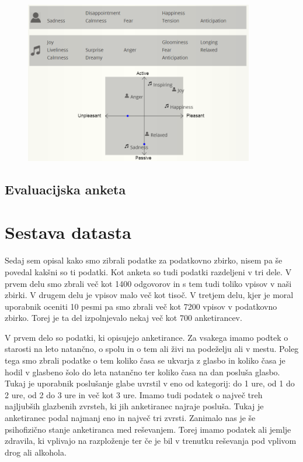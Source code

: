 \documentclass[a4paper, 12pt]{book}
\begin{document}
{\begin{figure}[hbt]
\centering
\includegraphics[width=10cm]{images/moodgraphdvo.png}

\caption{}
\label{moodgraphdvo}
\end{figure}

\subsection{Evaluacijska anketa}

\section{Sestava datasta}

Sedaj sem opisal kako smo zibrali podatke za podatkovno zbirko, nisem pa še povedal kakšni so ti podatki. Kot anketa so tudi podatki razdeljeni v tri dele. V prvem delu smo zbrali več kot 1400 odgovorov in s tem tudi toliko vpisov v naši zbirki. V drugem delu je vpisov malo več kot tisoč. V tretjem delu, kjer je moral uporabnik oceniti 10 pesmi pa smo zbrali več kot 7200 vpisov v podatkovno zbirko. Torej je ta del izpolnjevalo nekaj več kot 700 anketirancev.

V prvem delo so podatki, ki opisujejo anketirance. Za vsakega imamo podtek o starosti na leto natančno, o spolu in o tem ali živi na podeželju ali v mestu. Poleg tega smo zbrali podatke o tem koliko časa se ukvarja z glasbo in koliko časa je hodil v glasbeno šolo do leta natančno ter koliko časa na dan posluša glasbo. Tukaj je uporabnik poslušanje glabe uvrstil v eno od kategorij: do 1 ure, od 1 do 2 ure, od 2 do 3 ure in več kot 3 ure. Imamo tudi podatek o največ treh najljubših glazbenih zvrsteh, ki jih anketiranec najraje posluša. Tukaj je anketiranec podal najmanj eno in največ tri zvrsti. Zanimalo nas je še psihofizično stanje anketiranca med reševanjem. Torej imamo podatek ali jemlje zdravila, ki vplivajo na razploženje ter če je bil v trenutku reševanja pod vplivom drog ali alkohola. 

}
\end{document}

